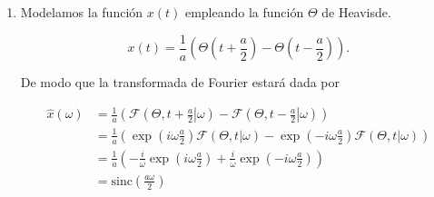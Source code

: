 \documentclass[a4paper,12pt,final]{article}
\begin{document}
      \begin{enumerate}[label=\alph*)]
        \item Modelamos la función $x\left(t\right)$ empleando la función
          $\Theta$ de Heavisde.

          \begin{equation*}
            x\left(t\right) = \frac{1}{a}\left(
                                \Theta\left(t + \frac{a}{2}\right) -
                                \Theta\left(t - \frac{a}{2}\right)
                              \right).
          \end{equation*}

          \noindent De modo que la transformada de Fourier estará dada por

          \begin{equation*}
            \begin{split}
              \widehat{x}\left(\omega\right) & = \frac{1}{a}\left(
                                                   \mathcal{F}\left(\Theta,\left.t + \frac{a}{2}\right|\omega\right) -
                                                   \mathcal{F}\left(\Theta,\left.t - \frac{a}{2}\right|\omega\right)
                                                 \right) \\
                                             & = \frac{1}{a}\left(
                                                   \exp\left( i\omega\frac{a}{2}\right)\mathcal{F}\left(\Theta,t|\omega\right) -
                                                   \exp\left(-i\omega\frac{a}{2}\right)\mathcal{F}\left(\Theta,t|\omega\right)
                                                 \right) \\
                                             & = \frac{1}{a}\left(
                                                   -\frac{i}{\omega}\exp\left( i\omega\frac{a}{2}\right)
                                                   +\frac{i}{\omega}\exp\left(-i\omega\frac{a}{2}\right)
                                                 \right) \\
                                             & = \mathrm{sinc}\left(\frac{a\omega}{2}\right)
            \end{split}
          \end{equation*}




\end{enumerate}
\end{document}
